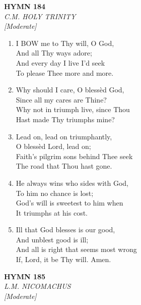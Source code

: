 \newpage
\begin{center}
    {\Large \textbf{HYMN 184}}
    \\
    \textit{C.M. HOLY TRINITY}
    \\
    \textit{\small [Moderate]}
\end{center}
\vspace{1em}

\begin{enumerate}
    \item I BOW me to Thy will, O God, \\
        And all Thy ways adore; \\
        And every day I live I'd seek \\
        To please Thee more and more.

    \item Why should I care, O bless\`ed God, \\
        Since all my cares are Thine? \\
        Why not in triumph live, since Thou \\
        Hast made Thy triumphs mine?

    \item Lead on, lead on triumphantly, \\
        O bless\`ed Lord, lead on; \\
        Faith's pilgrim sons behind Thee seek \\
        The road that Thou hast gone.

    \item He always wins who sides with God, \\
        To him no chance is lost; \\
        God's will is sweetest to him when \\
        It triumphs at his cost.

    \item Ill that God blesses is our good, \\
        And unblest good is ill; \\
        And all is right that seems most wrong \\
        If, Lord, it be Thy will. Amen.

\end{enumerate}

\newpage
\begin{center}
    {\Large \textbf{HYMN 185}}
    \\
    \textit{L.M. NICOMACHUS}
    \\
    \textit{\small [Moderate]}
\end{center}
\vspace{1em}

